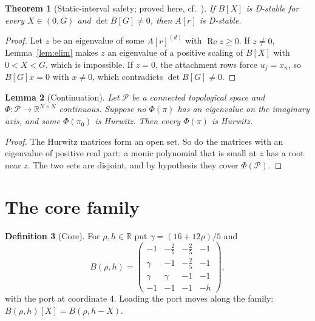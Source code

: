 \documentclass[11pt,a4paper]{article}
\theoremstyle{plain}
\newtheorem{theorem}{Theorem}[section]
\newtheorem{lemma}[theorem]{Lemma}
\theoremstyle{definition}
\newtheorem{definition}[theorem]{Definition}
\theoremstyle{remark}
\newcommand{\R}{\mathbb{R}}
\newcommand{\Real}{\operatorname{Re}}
\newcommand{\cP}{\mathcal{P}}
\newcommand{\scl}[2]{#1^{(#2)}}
\begin{document}
\begin{theorem}[{Static-interval safety; proved here, cf.~\cite{companion2026}}]\label{thm:safety}
If $B[X]$ is D-stable for every $X\in(0,G)$ and $\det B[G]\ne0$, then $A[r]$ is
D-stable.
\end{theorem}
\begin{proof}
Let $z$ be an eigenvalue of some $\scl{A[r]}d$ with $\Real z\ge0$. If $z\ne0$,
Lemma~\ref{lem:elim} makes $z$ an eigenvalue of a positive scaling of $B[X]$ with
$0<X<G$, which is impossible. If $z=0$, the attachment rows force $u_j=x_n$, so
$B[G]x=0$ with $x\ne0$, which contradicts $\det B[G]\ne0$.
\end{proof}

\begin{lemma}[Continuation]\label{lem:continuation}
Let $\cP$ be a connected topological space and $\Phi\colon\cP\to\R^{N\times N}$
continuous. Suppose no $\Phi(\pi)$ has an eigenvalue on the imaginary axis, and some
$\Phi(\pi_0)$ is Hurwitz. Then every $\Phi(\pi)$ is Hurwitz.
\end{lemma}
\begin{proof}
The Hurwitz matrices form an open set. So do the matrices with an eigenvalue of
positive real part: a monic polynomial that is small at $z$ has a root near $z$. The
two sets are disjoint, and by hypothesis they cover $\Phi(\cP)$.
\end{proof}

\section{The core family}\label{sec:core}

\begin{definition}[Core]\label{def:core}
For $\rho,h\in\R$ put $\gamma=(16+12\rho)/5$ and
\[
B(\rho,h)=\begin{pmatrix}
-1&-\tfrac25&-\tfrac25&-1\\
\gamma&-1&-\tfrac25&-1\\
\gamma&\gamma&-1&-1\\
-1&-1&-1&-h
\end{pmatrix},
\]
with the port at coordinate $4$. Loading the port moves along the family:
$B(\rho,h)[X]=B(\rho,h-X)$.
\end{definition}
\end{document}
